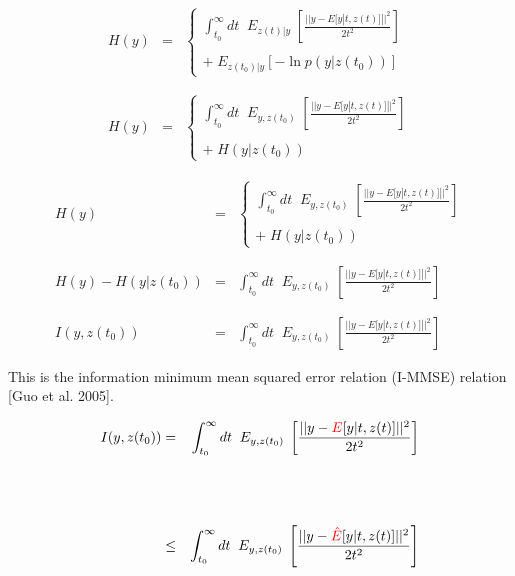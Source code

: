 {\begin{eqnarray*}
H(y) & = & \left\{\begin{array}{l}\int_{t_0}^\infty dt \;\; E_{z(t)|y}\;\left[\frac{||y - E[y|t,z(t)]||^2}{2t^2}\right] \\ \\ + \;E_{z(t_0)|y}[-\ln p(y|z(t_0))]\end{array}\right. \\
\\
\\
  H(y) & = & \left\{\begin{array}{l}\int_{t_0}^\infty dt \;\; E_{y,z(t_0)}\;\left[\frac{||y - E[y|t,z(t)]||^2}{2t^2}\right] \\ \\ +\;H(y|z(t_0))\end{array}\right.
\end{eqnarray*}


{\huge
\begin{eqnarray*}
  H(y) & = & \left\{\begin{array}{l}\int_{t_0}^\infty dt \;\; E_{y,z(t_0)}\;\left[\frac{||y - E[y|t,z(t)]||^2}{2t^2}\right] \\ \\ +\;H(y|z(t_0))\end{array}\right. \\
  \\
  \\
  H(y) - H(y|z(t_0)) & = & \int_{t_0}^\infty dt \;\; E_{y,z(t_0)}\;\left[\frac{||y - E[y|t,z(t)]||^2}{2t^2}\right] \\
  \\
  \\
  I(y,z(t_0)) & = & \int_{t_0}^\infty dt \;\; E_{y,z(t_0)}\;\left[\frac{||y - E[y|t,z(t)]||^2}{2t^2}\right] 
\end{eqnarray*}

\vfill
This is the information minimum mean squared error relation (I-MMSE) relation [Guo et al. 2005].
}


{\huge
\begin{eqnarray*}
  I(y,z(t_0)) & = & \int_{t_0}^\infty dt \;\; E_{y,z(t_0)}\;\left[\frac{||y - {\color{red}E}[y|t,z(t)]||^2}{2t^2}\right]  \\
  \\
  \\
  \\
  & \leq & \int_{t_0}^\infty dt \;\; E_{y,z(t_0)}\;\left[\frac{||y - {\color{red}\hat{E}}[y|t,z(t)]||^2}{2t^2}\right]
\end{eqnarray*}

}}
